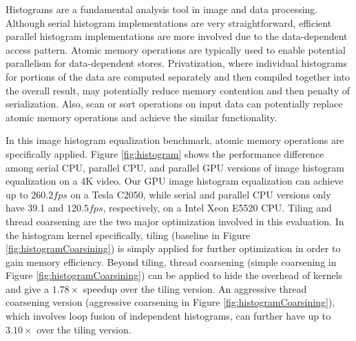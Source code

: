 Histograms are a fundamental analysis tool in image and data processing.
Although serial  histogram implementations are very straightforward, efficient parallel histogram implementations are
more involved due to the data-dependent access pattern. 
Atomic memory operations are typically used to enable potential parallelism for data-dependent stores. 
Privatization, where individual histograms for portions of the data are computed separately
and then compiled together into the overall result, may potentially reduce memory contention and then penalty of serialization.
Also, scan or sort operations on input data can potentially replace atomic memory operations and achieve the similar functionality.

In this image histogram equalization benchmark, atomic memory operations are specifically applied. 
Figure \ref{fig:histogram} shows the performance difference among serial CPU, 
parallel CPU, and parallel GPU versions of image histogram equalization on a 4K video.
Our GPU image histogram equalization can achieve up to $260.2 fps$ on a Tesla C2050, while serial and parallel CPU versions only have 39.1 and $120.5 fps$, respectively, on a Intel Xeon E5520 CPU.
Tiling and thread coarsening are the two major optimization involved in this evaluation.
In the histogram kernel specifically, tiling (baseline in Figure 
\ref{fig:histogramCoarsining}) is simply applied for further optimization in
order to gain memory efficiency.
Beyond tiling, thread coarsening (simple coarsening in Figure \ref{fig:histogramCoarsining}) can be applied to hide the overhead of kernels and give a $1.78\times$ speedup over the tiling version.
An aggressive thread coarsening version (aggressive coarsening in Figure \ref{fig:histogramCoarsining}), which involves loop fusion of independent histograms, can further have up to $3.10\times$ over the tiling version.

